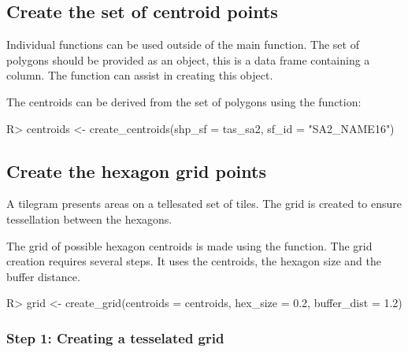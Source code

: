 \documentclass[
]{jss}
\begin{document}
\hypertarget{create-the-set-of-centroid-points}{%
\subsection{Create the set of centroid
points}\label{create-the-set-of-centroid-points}}

Individual  functions can be used outside of the main
function. The set of polygons should be provided as an  object,
this is a data frame containing a  column. The
 function can assist in creating this object.

The centroids can be derived from the set of polygons using the
 function:

\begin{CodeChunk}

\begin{CodeInput}
R> centroids <- create_centroids(shp_sf = tas_sa2, sf_id = "SA2_NAME16")
\end{CodeInput}
\end{CodeChunk}

\hypertarget{create-the-hexagon-grid-points}{%
\subsection{Create the hexagon grid
points}\label{create-the-hexagon-grid-points}}

A tilegram presents areas on a tellesated set of tiles. The grid is
created to ensure tessellation between the hexagons.

The grid of possible hexagon centroids is made using the
 function. The grid creation requires several steps.
It uses the centroids, the hexagon size and the buffer distance.

\begin{CodeChunk}

\begin{CodeInput}
R> grid <- create_grid(centroids = centroids, hex_size = 0.2, buffer_dist = 1.2)
\end{CodeInput}
\end{CodeChunk}

\hypertarget{step-1-creating-a-tesselated-grid}{%
\subsubsection{Step 1: Creating a tesselated
grid}\label{step-1-creating-a-tesselated-grid}}
\end{document}
